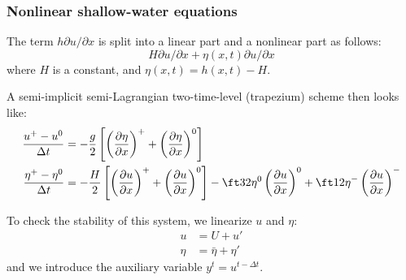 \documentclass[aspectratio=43,9pt]{beamer}
\begin{document}
\begin{frame}
	\frametitle{Nonlinear shallow-water equations}
	\begin{myitemize}{2ex}
		\item The  term $h\partial u/\partial x$ is split into a linear part and a nonlinear part as follows:
			\begin{equation*}
				H\partial u/\partial x+\eta(x,t)\partial u/\partial x
			\end{equation*}
			where $H$ is a constant, and $\eta(x,t)=h(x,t)-H$.
		\item A semi-implicit semi-Lagrangian two-time-level (trapezium) scheme then looks like:
			\begin{align*}
				\frac{u^+ - u^0}{\Delta t} & = -  \frac{g}{2} \left[	\left( \frac{\partial \eta}{\partial x} \right)^+
					+ \left( \frac{\partial \eta}{\partial x} \right)^0\right]	\\
				\frac{\eta^+ - \eta^0}{\Delta t} &= - \frac{H}{2} \left[ \left( \frac{\partial u}{\partial x} \right)^+
					+ \left( \frac{\partial u}{\partial x} \right)^0 \right]
					- \ft32 \eta^0 \left( \frac{\partial u}{\partial x} \right)^0 
					+ \ft12 \eta^- \left( \frac{\partial u}{\partial x} \right)^-
			\end{align*}
		\item To check the stability of this system, we linearize $u$ and $\eta$:
			\begin{align*}
				u	&=U+u'	\\
				\eta&=\bar\eta+\eta'
			\end{align*}
			and we introduce the auxiliary variable $y^{t}=u^{t-\Delta t}$.
	\end{myitemize}
\end{frame}
%
%
\end{document}
